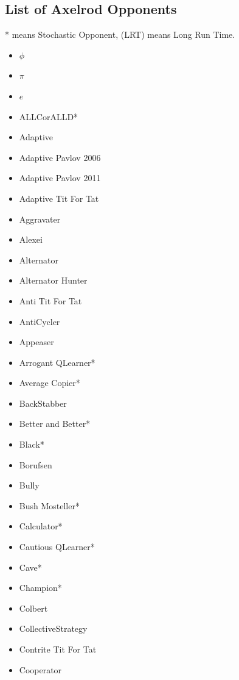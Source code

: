 \begin{appendices}
    \chapter{List of Axelrod Opponents}\label{apndx:opponents}
    * means Stochastic Opponent, (LRT) means Long Run Time.
    \begin{multicols}{4}
        \begin{itemize}
            \item $\phi$
            \item $\pi$
            \item $e$
            \item ALLCorALLD*
            \item Adaptive
            \item Adaptive Pavlov 2006
            \item Adaptive Pavlov 2011
            \item Adaptive Tit For Tat
            \item Aggravater
            \item Alexei
            \item Alternator
            \item Alternator Hunter
            \item Anti Tit For Tat
            \item AntiCycler
            \item Appeaser
            \item Arrogant QLearner*
            \item Average Copier*
            \item BackStabber
            \item Better and Better*
            \item Black*
            \item Borufsen
            \item Bully
            \item Bush Mosteller*
            \item Calculator*
            \item Cautious QLearner*
            \item Cave*
            \item Champion*
            \item Colbert
            \item CollectiveStrategy
            \item Contrite Tit For Tat
            \item Cooperator

\end{itemize}
\end{multicols}
\end{appendices}
